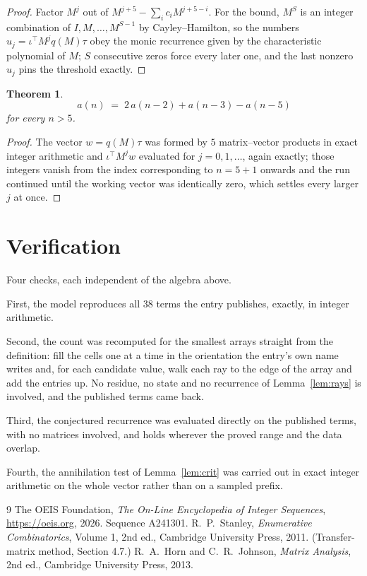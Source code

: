 \documentclass[11pt,a4paper]{article}
\theoremstyle{plain}
\newtheorem{theorem}{Theorem}
\theoremstyle{definition}
\begin{document}
\begin{proof}
Factor $M^{j}$ out of $M^{j+5}-\sum_ic_iM^{j+5-i}$. For the bound, $M^{S}$
is an integer combination of $I,M,\dots,M^{S-1}$ by Cayley--Hamilton, so the numbers
$u_j=\iota^{\!\top}M^{j}q(M)\tau$ obey the monic recurrence given by the characteristic
polynomial of $M$; $S$ consecutive zeros force every later one, and the last nonzero $u_j$
pins the threshold exactly.
\end{proof}

\begin{theorem}
\[
a(n)\;=\;2\,a(n-2) + a(n-3) - a(n-5)
\]
for every $n>5$.
\end{theorem}

\begin{proof}
The vector $w=q(M)\tau$ was formed by $5$ matrix--vector products in exact integer
arithmetic and $\iota^{\!\top}M^{j}w$ evaluated for $j=0,1,\dots$, again exactly; those
integers vanish from the index corresponding to $n=5+1$ onwards and the run continued
until the working vector was identically zero, which settles every larger $j$ at once.
\end{proof}

\section{Verification}

Four checks, each independent of the algebra above.

First, the model reproduces all $38$ terms the entry publishes, exactly, in integer
arithmetic.

Second, the count was recomputed for the smallest arrays straight from the definition: fill the
cells one at a time in the orientation the entry's own name writes and, for each candidate
value, walk each ray to the edge of the array and add the entries up. No residue, no state and
no recurrence of Lemma~\ref{lem:rays} is involved, and the published terms came back.

Third, the conjectured recurrence was evaluated directly on the published terms, with no
matrices involved, and holds wherever the proved range and the data overlap.

Fourth, the annihilation test of Lemma~\ref{lem:crit} was carried out in exact integer
arithmetic on the whole vector rather than on a sampled prefix.

\begin{thebibliography}{9}
 The OEIS Foundation, \emph{The On-Line Encyclopedia of Integer
Sequences}, \url{https://oeis.org}, 2026. Sequence A241301.
 R.~P.~Stanley, \emph{Enumerative Combinatorics}, Volume 1, 2nd ed.,
Cambridge University Press, 2011. (Transfer-matrix method, Section 4.7.)
 R.~A.~Horn and C.~R.~Johnson, \emph{Matrix Analysis}, 2nd ed., Cambridge
University Press, 2013.
\end{thebibliography}
\end{document}
